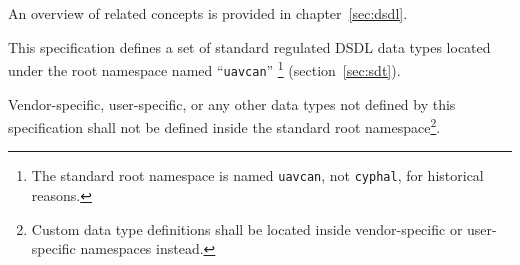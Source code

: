An overview of related concepts is provided in chapter~\ref{sec:dsdl}.

This specification defines a set of standard regulated DSDL data types located under
the root namespace named ``\verb"uavcan"''%
\footnote{The standard root namespace is named \texttt{uavcan}, not \texttt{cyphal}, for historical reasons.}
(section~\ref{sec:sdt}).

Vendor-specific, user-specific, or any other data types not defined by this specification
shall not be defined inside the standard root namespace\footnote{Custom data type definitions shall be located
inside vendor-specific or user-specific namespaces instead.}.
